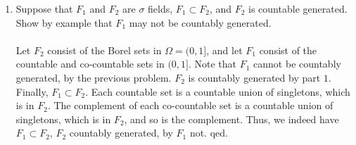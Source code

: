 \documentclass[12pt,a4paper]{article}
\newcommand{\1}[1]{\mathbbm{1}\left\{ #1 \right\}}
\begin{document}
\begin{enumerate}
	\item Suppose that $F_1$ and $F_2$ are $\sigma$ fields, $F_1 \subset F_2$, and $F_2$ is countable generated. Show by example that $F_1$ may not be countably generated.
	\\\\
	Let $F_2$ consist of the Borel sets in $\Omega = (0,1]$, and let $F_1$ consist of the countable and co-countable sets in $(0,1]$. Note that $F_1$ cannot be countably generated, by the previous problem. $F_2$ is countably generated by part $1$. Finally, $F_1 \subset F_2$. Each countable set is a countable union of singletons, which is in $F_2$. The complement of each co-countable set is a countable union of singletons, which is in $F_2$, and so is the complement. Thus, we indeed have $F_1 \subset F_2$, $F_2$ countably generated, by $F_1$ not. qed.
\end{enumerate}
\end{document}

